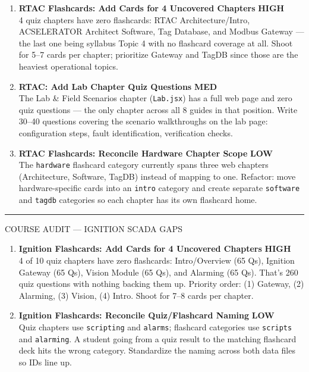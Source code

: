 \documentclass[10pt]{article}
\newcommand{\high}{\textcolor{sred}{\small\bfseries HIGH}}
\newcommand{\med}{\textcolor{samber}{\small\bfseries MED}}
\newcommand{\low}{\textcolor{sgreen}{\small\bfseries LOW}}
\begin{document}
\begin{enumerate}[resume]\small
  \item \textbf{RTAC Flashcards: Add Cards for 4 Uncovered Chapters} \hfill \high \\
    4 quiz chapters have zero flashcards: RTAC Architecture/Intro, ACSELERATOR Architect Software, Tag Database, and Modbus Gateway — the last one being syllabus Topic 4 with no flashcard coverage at all. Shoot for 5--7 cards per chapter; prioritize Gateway and TagDB since those are the heaviest operational topics.

  \item \textbf{RTAC: Add Lab Chapter Quiz Questions} \hfill \med \\
    The Lab \& Field Scenarios chapter (\texttt{Lab.jsx}) has a full web page and zero quiz questions — the only chapter across all 8 guides in that position. Write 30--40 questions covering the scenario walkthroughs on the lab page: configuration steps, fault identification, verification checks.

  \item \textbf{RTAC Flashcards: Reconcile Hardware Chapter Scope} \hfill \low \\
    The \texttt{hardware} flashcard category currently spans three web chapters (Architecture, Software, TagDB) instead of mapping to one. Refactor: move hardware-specific cards into an \texttt{intro} category and create separate \texttt{software} and \texttt{tagdb} categories so each chapter has its own flashcard home.
\end{enumerate}

\smallskip
{\color{snavy}\rule{\linewidth}{0.4pt}}
\smallskip

{\small\sffamily\color{sgray}\MakeUppercase{Course Audit — Ignition SCADA Gaps}}
\smallskip

\begin{enumerate}[resume]\small
  \item \textbf{Ignition Flashcards: Add Cards for 4 Uncovered Chapters} \hfill \high \\
    4 of 10 quiz chapters have zero flashcards: Intro/Overview (65 Qs), Ignition Gateway (65 Qs), Vision Module (65 Qs), and Alarming (65 Qs). That's 260 quiz questions with nothing backing them up. Priority order: (1) Gateway, (2) Alarming, (3) Vision, (4) Intro. Shoot for 7--8 cards per chapter.

  \item \textbf{Ignition Flashcards: Reconcile Quiz/Flashcard Naming} \hfill \low \\
    Quiz chapters use \texttt{scripting} and \texttt{alarms}; flashcard categories use \texttt{scripts} and \texttt{alarming}. A student going from a quiz result to the matching flashcard deck hits the wrong category. Standardize the naming across both data files so IDs line up.
\end{enumerate}
\end{document}
